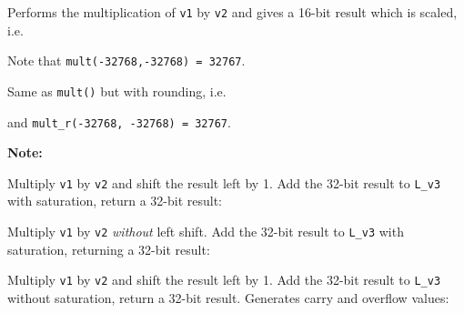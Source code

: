 

Performs the multiplication of {\tt v1} by {\tt v2} and gives a 16-bit
result which is scaled, i.e.


Note that {\tt mult(-32768,-32768) = 32767}.


Same as {\tt mult()} but with rounding, i.e.


and {\tt mult\_r(-32768, -32768) = 32767}.

\textbf{Note:} \hfill {}


Multiply {\tt v1} by {\tt v2} and shift the result left by 1. Add the
32-bit result to {\tt L\_v3} with saturation, return a 32-bit result:



Multiply {\tt v1} by {\tt v2} {\em without} left shift. Add the 32-bit
result to {\tt L\_v3} with saturation, returning a 32-bit result:



Multiply {\tt v1} by {\tt v2} and shift the result left by 1. Add the
32-bit result to {\tt L\_v3} without saturation, return a 32-bit
result. Generates carry and overflow values:



